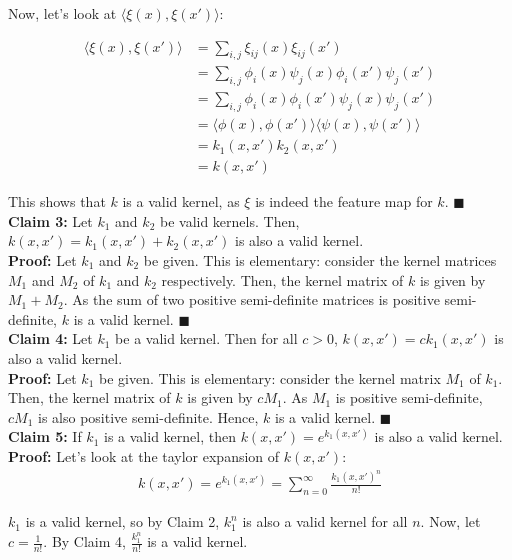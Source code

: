 \documentclass[a4paper]{article}
\begin{document}
Now, let's look at $\langle \xi(x), \xi(x') \rangle$:

\begin{align*}
    \langle \xi(x), \xi(x') \rangle &= \sum_{i,j} \xi_{ij}(x) \xi_{ij}(x') \\
    &= \sum_{i,j} \phi_i(x) \psi_j(x) \phi_i(x') \psi_j(x') \\
    &= \sum_{i,j} \phi_i(x) \phi_i(x') \psi_j(x) \psi_j(x') \\
    &= \langle \phi(x), \phi(x') \rangle \langle \psi(x), \psi(x') \rangle \\
    &= k_1(x, x')k_2(x, x')\\
    &= k(x, x')
\end{align*}

This shows that $k$ is a valid kernel, as $\xi$ is indeed the feature map for $k$. $\blacksquare$\\

\textbf{Claim 3:} Let $k_1$ and $k_2$ be valid kernels. Then, $k(x, x') = k_1(x, x') + k_2(x, x')$ is also a valid kernel.\\

\textbf{Proof:} Let $k_1$ and $k_2$ be given. This is elementary: consider the kernel matrices $M_1$ and $M_2$ of $k_1$ and $k_2$ respectively. Then, the kernel matrix of $k$ is given by $M_1 + M_2$. As the sum of two positive semi-definite matrices is positive semi-definite, $k$ is a valid kernel. $\blacksquare$\\

\textbf{Claim 4:} Let $k_1$ be a valid kernel. Then for all $c > 0$, $k(x, x') = ck_1(x, x')$ is also a valid kernel.\\

\textbf{Proof:} Let $k_1$ be given. This is elementary: consider the kernel matrix $M_1$ of $k_1$. Then, the kernel matrix of $k$ is given by $cM_1$. As $M_1$ is positive semi-definite, $cM_1$ is also positive semi-definite. Hence, $k$ is a valid kernel. $\blacksquare$\\

\textbf{Claim 5:} If $k_1$ is a valid kernel, then $k(x, x') = e^{k_1(x, x')}$ is also a valid kernel.\\

\textbf{Proof:} Let's look at the taylor expansion of $k(x, x')$:
\begin{align*}
    k(x, x') = e^{k_1(x, x')} = \sum_{n=0}^{\infty} \frac{k_1(x, x')^n}{n!}
\end{align*}

$k_1$ is a valid kernel, so by Claim 2, $k_1^n$ is also a valid kernel for all $n$. Now, let $c = \frac{1}{n!}$. By Claim 4, $\frac{k_1^n}{n!}$ is a valid kernel.\\
\end{document}
